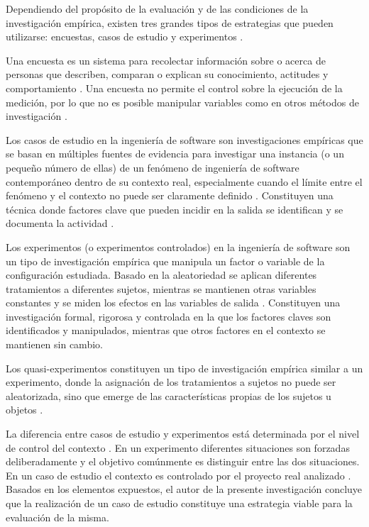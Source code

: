 Dependiendo del propósito de la evaluación y de las condiciones de la investigación empírica, existen tres grandes tipos de estrategias que pueden utilizarse: encuestas, casos de estudio y experimentos \citep{Wohlin2012}.

Una encuesta es un sistema para recolectar información sobre o acerca de personas que describen, comparan o explican su conocimiento, actitudes y comportamiento \citep{Wohlin2012}. Una encuesta no permite el control sobre la ejecución de la medición, por lo que no es posible manipular variables como en otros métodos de investigación \citep{Wohlin2012}.

Los casos de estudio en la ingeniería de software son investigaciones empíricas que se basan en múltiples fuentes de evidencia para investigar una instancia (o un pequeño número de ellas) de un fenómeno de ingeniería de software contemporáneo dentro de su contexto real, especialmente cuando el límite entre el fenómeno y el contexto no puede ser claramente definido \citep{Runeson:2012:CSR:2361717,Wohlin2012}. Constituyen una técnica donde factores clave que pueden incidir en la salida se identifican y se documenta la actividad \citep{stake1995art}. 

Los experimentos (o experimentos controlados) en la ingeniería de software son un tipo de investigación empírica que manipula un factor o variable de la configuración estudiada. Basado en la aleatoriedad se aplican diferentes tratamientos a diferentes sujetos, mientras se mantienen otras variables constantes y se miden los efectos en las variables de salida \citep{Wohlin2012}. Constituyen una investigación formal, rigorosa y controlada en la que los factores claves son identificados y manipulados, mientras que otros factores en el contexto se mantienen sin cambio.

Los quasi-experimentos constituyen un tipo de investigación empírica similar a un experimento, donde la asignación de los tratamientos a sujetos no puede ser aleatorizada, sino que emerge de las características propias de los sujetos u objetos \citep{Wohlin2012}. 

La diferencia entre casos de estudio y experimentos está determinada por el nivel de control del contexto \citep{Petersen:2009:CIS:1671248.1671293}. En un experimento diferentes situaciones son forzadas deliberadamente y el objetivo comúnmente es distinguir entre las dos situaciones. En un caso de estudio el contexto es controlado por el proyecto real analizado \citep{Wohlin2012}. Basados en los elementos expuestos, el autor de la presente investigación concluye que la realización de un caso de estudio constituye una estrategia viable para la evaluación de la misma. 

